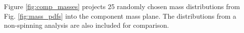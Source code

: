 Figure \ref{fig:comp_masses} projects 25 randomly chosen mass distributions from Fig. \ref{fig:mass_pdfs} into the component mass plane.  The distributions from a non-spinning analysis are also included for comparison.